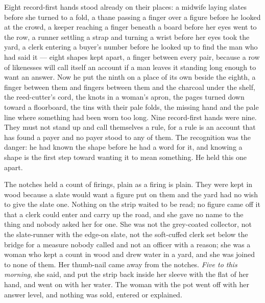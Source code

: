 Eight record-first hands stood already on their places: a midwife laying slates before she turned to a fold, a thane passing a finger over a figure before he looked at the crowd, a keeper reaching a finger beneath a board before her eyes went to the row, a runner settling a strap and turning a wrist before her eyes took the yard, a clerk entering a buyer's number before he looked up to find the man who had said it --- eight shapes kept apart, a finger between every pair, because a row of likenesses will call itself an account if a man leaves it standing long enough to want an answer. Now he put the ninth on a place of its own beside the eighth, a finger between them and fingers between them and the charcoal under the shelf, the reed-cutter's cord, the knots in a woman's apron, the pages turned down toward a floorboard, the tins with their pale folds, the missing hand and the pale line where something had been worn too long. Nine record-first hands were nine. They must not stand up and call themselves a rule, for a rule is an account that has found a payer and no payer stood to any of them. The recognition was the danger: he had known the shape before he had a word for it, and knowing a shape is the first step toward wanting it to mean something. He held this one apart.

The notches held a count of firings, plain as a firing is plain. They were kept in wood because a slate would want a figure put on them and the yard had no wish to give the slate one. Nothing on the strip waited to be read; no figure came off it that a clerk could enter and carry up the road, and she gave no name to the thing and nobody asked her for one. She was not the grey-coated collector, not the slate-runner with the edge-on slate, not the soft-cuffed clerk set below the bridge for a measure nobody called and not an officer with a reason; she was a woman who kept a count in wood and drew water in a yard, and she was joined to none of them. Her thumb-nail came away from the notches. \emph{Five to this morning}, she said, and put the strip back inside her sleeve with the flat of her hand, and went on with her water. The woman with the pot went off with her answer level, and nothing was sold, entered or explained.

